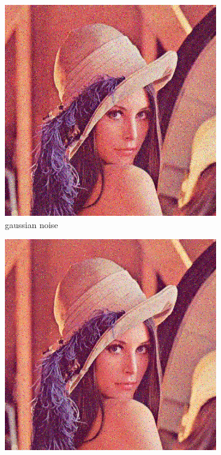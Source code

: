\documentclass[12pt]{article}
\begin{document}
\begin{figure}[ht]
\begin{subfigure}[t]{\subfiguresize}
        \includegraphics[width=\textwidth]{lenac_normal3.png}
        \caption{gaussian noise}
    \end{subfigure}
    \begin{subfigure}[t]{\subfiguresize}
        \includegraphics[width=\textwidth]{lenac_impulse3.png}

\end{subfigure}
\end{figure}
\end{document}
